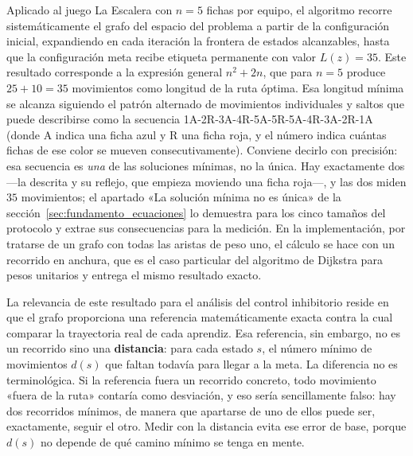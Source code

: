 \documentclass{book}
\begin{document}
Aplicado al juego La Escalera con $n = 5$ fichas por equipo, el algoritmo
recorre sistemáticamente el grafo del espacio del problema a partir de la
configuración inicial, expandiendo en cada iteración la frontera de
estados alcanzables, hasta que la configuración meta recibe etiqueta
permanente con valor $L(z) = 35$. Este resultado corresponde a la
expresión general $n^2 + 2n$, que para $n = 5$ produce $25 + 10 = 35$
movimientos como longitud de la ruta óptima. Esa longitud mínima se
alcanza siguiendo el patrón alternado de movimientos individuales y
saltos que puede describirse como la secuencia
1A-2R-3A-4R-5A-5R-5A-4R-3A-2R-1A (donde A indica una ficha azul y R una
ficha roja, y el número indica cuántas fichas de ese color se mueven
consecutivamente). Conviene decirlo con precisión: esa secuencia es
\textit{una} de las soluciones mínimas, no la única. Hay exactamente dos
—la descrita y su reflejo, que empieza moviendo una ficha roja—, y las
dos miden $35$ movimientos; el apartado «La solución mínima no es única»
de la sección~\ref{sec:fundamento_ecuaciones} lo demuestra para los cinco
tamaños del protocolo y extrae sus consecuencias para la medición. En la
implementación, por tratarse de un grafo con todas las aristas de peso
uno, el cálculo se hace con un recorrido en anchura, que es el caso
particular del algoritmo de Dijkstra para pesos unitarios y entrega el
mismo resultado exacto.
 
La relevancia de este resultado para el análisis del control inhibitorio
reside en que el grafo proporciona una referencia matemáticamente exacta
contra la cual comparar la trayectoria real de cada aprendiz. Esa
referencia, sin embargo, no es un recorrido sino una \textbf{distancia}:
para cada estado $s$, el número mínimo de movimientos $d(s)$ que faltan
todavía para llegar a la meta. La diferencia no es terminológica. Si la
referencia fuera un recorrido concreto, todo movimiento «fuera de la
ruta» contaría como desviación, y eso sería sencillamente falso: hay dos
recorridos mínimos, de manera que apartarse de uno de ellos puede ser,
exactamente, seguir el otro. Medir con la distancia evita ese error de
base, porque $d(s)$ no depende de qué camino mínimo se tenga en mente.
\end{document}
